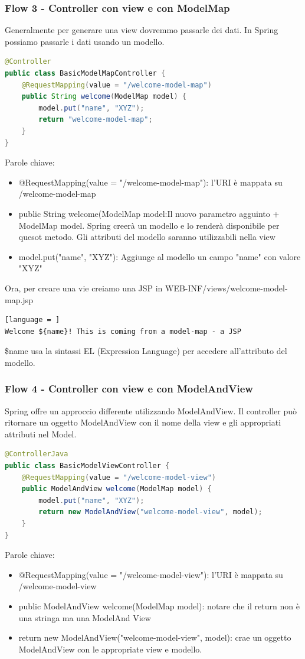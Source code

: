 \documentclass[11pt,a4paper]{book}
\begin{document}
\subsubsection{Flow 3 - Controller con view e con ModelMap} \label{flow3}
Generalmente per generare una view dovremmo passarle dei dati. In Spring possiamo passarle i dati usando un modello.
\begin{lstlisting}[language = Java]
@Controller
public class BasicModelMapController {
	@RequestMapping(value = "/welcome-model-map")
	public String welcome(ModelMap model) {
		model.put("name", "XYZ");
		return "welcome-model-map";
	}
}
\end{lstlisting}
Parole chiave:
\begin{itemize}
	\item $@$RequestMapping(value = "/welcome-model-map"): l'URI è mappata su /welcome-model-map
	\item public String welcome(ModelMap model:Il nuovo parametro agguinto + ModelMap model. Spring creerà un modello e lo renderà disponibile per quesot metodo. Gli attributi del modello saranno utilizzabili nella view
	\item model.put("name", "XYZ"): Aggiunge al modello un campo "name" con valore "XYZ"
\end{itemize}

Ora, per creare una vie creiamo una JSP in WEB-INF/views/welcome-model-map.jsp
\begin{lstlisting}[language = ]
Welcome ${name}! This is coming from a model-map - a JSP
\end{lstlisting}
\${name} usa la sintassi EL (Expression Language) per accedere all'attributo del modello.

\subsubsection{Flow 4 - Controller con view e con ModelAndView} \label{flow4}
Spring offre un approccio differente utilizzando ModelAndView. Il controller può ritornare un oggetto ModelAndView con il nome della view e gli appropriati attributi nel Model.
\begin{lstlisting}[language = Java]
@ControllerJava
public class BasicModelViewController {
	@RequestMapping(value = "/welcome-model-view")
	public ModelAndView welcome(ModelMap model) {
		model.put("name", "XYZ");
		return new ModelAndView("welcome-model-view", model);
	}
}
\end{lstlisting}
Parole chiave:
\begin{itemize}
	\item $@$RequestMapping(value = "/welcome-model-view"): l'URI è mappata su /welcome-model-view
	\item public ModelAndView welcome(ModelMap model): notare che il return non è una stringa ma una ModelAnd View
	\item return new ModelAndView("welcome-model-view", model): crae un oggetto ModelAndView con le appropriate view e modello.
\end{itemize}
\end{document}
